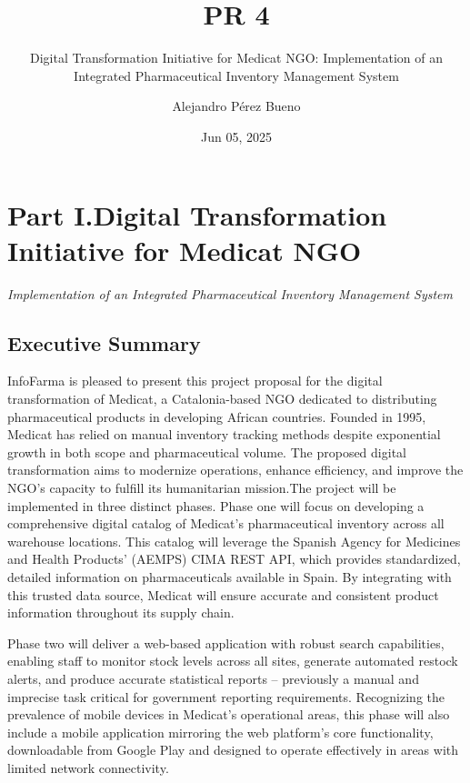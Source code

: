 \documentclass[
]{report}
\title{PR 4}
\subtitle{Digital Transformation Initiative for Medicat NGO:
Implementation of an Integrated Pharmaceutical Inventory Management
System}
\author{Alejandro Pérez Bueno}
\date{Jun 05, 2025}
\renewcommand*\contentsname{Table of contents}
\newcommand\contentsname{Table of contents}
\begin{document}
\maketitle

\renewcommand*\contentsname{Table of Contents}
{
\hypersetup{linkcolor=}
\setcounter{tocdepth}{2}
\tableofcontents
}

\newpage{}

\chapter{Part I.Digital Transformation Initiative for Medicat
NGO}\label{part-i.digital-transformation-initiative-for-medicat-ngo}

\emph{Implementation of an Integrated Pharmaceutical Inventory
Management System}

\section{Executive Summary}\label{executive-summary}

InfoFarma is pleased to present this project proposal for the digital
transformation of Medicat, a Catalonia-based NGO dedicated to
distributing pharmaceutical products in developing African countries.
Founded in 1995, Medicat has relied on manual inventory tracking methods
despite exponential growth in both scope and pharmaceutical volume. The
proposed digital transformation aims to modernize operations, enhance
efficiency, and improve the NGO's capacity to fulfill its humanitarian
mission.The project will be implemented in three distinct phases. Phase
one will focus on developing a comprehensive digital catalog of
Medicat's pharmaceutical inventory across all warehouse locations. This
catalog will leverage the Spanish Agency for Medicines and Health
Products' (AEMPS) CIMA REST API, which provides standardized, detailed
information on pharmaceuticals available in Spain. By integrating with
this trusted data source, Medicat will ensure accurate and consistent
product information throughout its supply chain.

Phase two will deliver a web-based application with robust search
capabilities, enabling staff to monitor stock levels across all sites,
generate automated restock alerts, and produce accurate statistical
reports -- previously a manual and imprecise task critical for
government reporting requirements. Recognizing the prevalence of mobile
devices in Medicat's operational areas, this phase will also include a
mobile application mirroring the web platform's core functionality,
downloadable from Google Play and designed to operate effectively in
areas with limited network connectivity.
\end{document}
